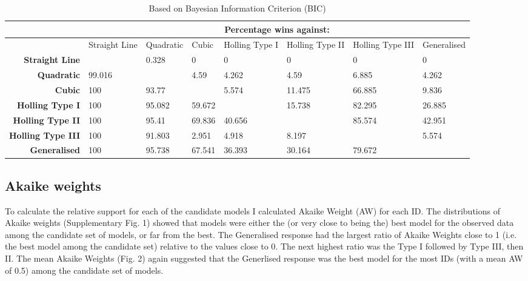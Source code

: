 \documentclass[11pt]{article}
\begin{document}
\begin{landscape}
\begin{table}[ht]
    \bigskip
    \begin{subtable}{1\textwidth}
    \centering
    \caption{Based on Bayesian Information Criterion (BIC)}\label{tab:sub_second}   
    \begin{tabular}{|r|lllllll|}
        \hline
        & \multicolumn{7}{c|}{Percentage wins against:} \\ 
        \toprule
       & Straight Line & Quadratic & Cubic & Holling Type I & Holling Type II & Holling Type III & Generalised \\ 
       \midrule
       {\textbf{Straight Line}} &  & 0.328 & 0 & 0 & 0 & 0 & 0 \\ 
         {\textbf{Quadratic}} & 99.016 &  & 4.59 & 4.262 & 4.59 & 6.885 & 4.262 \\ 
         {\textbf{Cubic}} & 100 & 93.77 &  & 5.574 & 11.475 & 66.885 & 9.836 \\ 
         {\textbf{Holling Type I}} & 100 & 95.082 & 59.672 &  & 15.738 & 82.295 & 26.885 \\ 
         {\textbf{Holling Type II}} & 100 & 95.41 & 69.836 & 40.656 &  & 85.574 & 42.951 \\ 
         {\textbf{Holling Type III}} & 100 & 91.803 & 2.951 & 4.918 & 8.197 &  & 5.574 \\ 
         {\textbf{Generalised}} & 100 & 95.738 & 67.541 & 36.393 & 30.164 & 79.672 &  \\ 
          \bottomrule
      \end{tabular}
       
    \end{subtable}
    
    \end{table}

\end{landscape}
            
        \subsection{Akaike weights}            
            To calculate the relative support for each of the candidate models I calculated Akaike Weight (AW) for each ID. The distributions of Akaike weights (Supplementary Fig. 1) showed that models were either the (or very close to being the) best model for the observed data among the candidate set of models, or far from the best. The Generalised response had the largest ratio of Akaike Weights close to 1 (i.e. the best model among the candidate set) relative to the values close to 0. The next highest ratio was the Type I followed by Type III, then II. The mean Akaike Weights (Fig. 2) again suggested that the Generlised response was the best model for the most IDs (with a mean AW of 0.5) among the candidate set of models.
\end{document}
